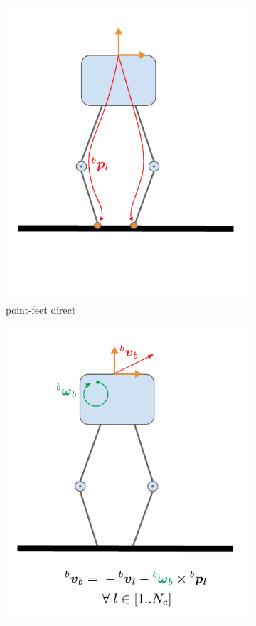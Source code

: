 \begin{figure}
\begin{subfigure}{.33\linewidth}
        \includegraphics[width=\textwidth]{figures/robot_kinematic_types_point_direct.pdf}
        \caption{point-feet direct}
        \label{fig:kin_point_direct}
    \end{subfigure}%
        \hfill
    \begin{subfigure}{.33\linewidth}
        \centering
        \includegraphics[width=\textwidth]{figures/robot_kinematic_types_point_vel.pdf}

\end{subfigure}
\end{figure}
